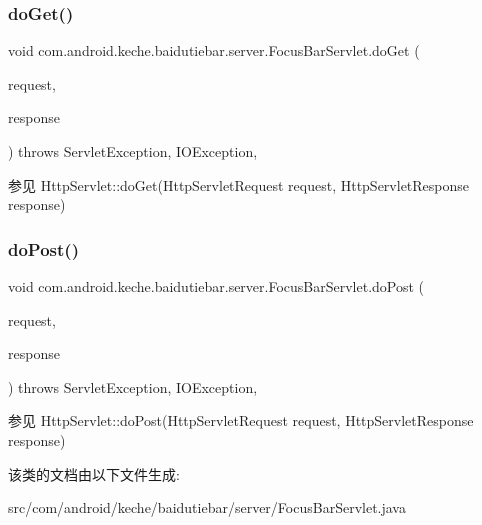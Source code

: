 \subsubsection{\texorpdfstring{do\+Get()}{doGet()}}
{\footnotesize\ttfamily void com.\+android.\+keche.\+baidutiebar.\+server.\+Focus\+Bar\+Servlet.\+do\+Get (\begin{DoxyParamCaption}\item[{Http\+Servlet\+Request}]{request,  }\item[{Http\+Servlet\+Response}]{response }\end{DoxyParamCaption}) throws Servlet\+Exception, I\+O\+Exception\hspace{0.3cm}{\ttfamily [inline]}, {\ttfamily [protected]}}

\begin{DoxySeeAlso}{参见}
Http\+Servlet\+::do\+Get(\+Http\+Servlet\+Request request, Http\+Servlet\+Response response) 
\end{DoxySeeAlso}
\mbox{\label{classcom_1_1android_1_1keche_1_1baidutiebar_1_1server_1_1_focus_bar_servlet_a1cb2ed55c3e4948ec9312e32379bd0ae}} 
\subsubsection{\texorpdfstring{do\+Post()}{doPost()}}
{\footnotesize\ttfamily void com.\+android.\+keche.\+baidutiebar.\+server.\+Focus\+Bar\+Servlet.\+do\+Post (\begin{DoxyParamCaption}\item[{Http\+Servlet\+Request}]{request,  }\item[{Http\+Servlet\+Response}]{response }\end{DoxyParamCaption}) throws Servlet\+Exception, I\+O\+Exception\hspace{0.3cm}{\ttfamily [inline]}, {\ttfamily [protected]}}

\begin{DoxySeeAlso}{参见}
Http\+Servlet\+::do\+Post(\+Http\+Servlet\+Request request, Http\+Servlet\+Response response) 
\end{DoxySeeAlso}


该类的文档由以下文件生成\+:\begin{DoxyCompactItemize}
\item 
src/com/android/keche/baidutiebar/server/Focus\+Bar\+Servlet.\+java\end{DoxyCompactItemize}
